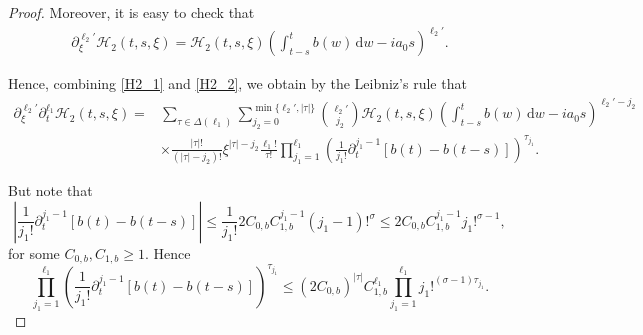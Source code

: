 \documentclass[10pt,a4paper]{amsart}
\begin{document}
\begin{proof}
    Moreover, it is easy to check that 
    \begin{align}\label{H2_2}
        \partial_\xi^{\ell_2'}\mathcal{H}_2(t,s,\xi) = \mathcal{H}_2(t,s,\xi)\left(\int_{t-s}^tb(w)\,\mathrm{d}w-ia_0s\right)^{\ell_2'}.
    \end{align}
    
    Hence, combining \eqref{H2_1} and \eqref{H2_2}, we obtain by the Leibniz's rule that
    \begin{align*}
    \partial_\xi^{\ell_2'}\partial_t^{\ell_1}\mathcal{H}_2(t,s,\xi) =&\sum_{\tau\in\Delta(\ell_1)}\sum_{j_2=0}^{\min\{\ell_2',|\tau|\}}\binom{\ell_2'}{j_2}\mathcal{H}_2(t,s,\xi)\left(\int_{t-s}^tb(w)\,\mathrm{d}w-ia_0s\right)^{\ell_2'-j_2}\\&\times\frac{|\tau|!}{(|\tau|-j_2)!}\xi^{|\tau|-j_2}
    \frac{\ell_1!}{\tau!}\prod_{j_1=1}^{\ell_1}\left(\frac{1}{j_1!}\partial_t^{j_1-1}[b(t)-b(t-s)]\right)^{\tau_{j_1}}. 
\end{align*}

But note that
\begin{equation*}
    \left|\frac{1}{j_1!}\partial_t^{j_1-1}[b(t)-b(t-s)]\right|\leq \frac{1}{j_1!}2C_{0,b}C_{1,b}^{j_1-1}(j_1-1)!^\sigma\leq 2C_{0,b}C_{1,b}^{j_1-1}j_1!^{\sigma-1}, 
\end{equation*}
for some $C_{0,b},C_{1,b}\geq 1$. Hence
\begin{equation*}
   \prod_{j_1=1}^{\ell_1}\left(\frac{1}{j_1!}\partial_t^{j_1-1}[b(t)-b(t-s)]\right)^{\tau_{j_1}}\leq (2C_{0,b})^{|\tau|}C_{1,b}^{\ell_1}\prod_{j_1=1}^{\ell_1}j_1!^{(\sigma-1)\tau_{j_1}}. 
\end{equation*}


\end{proof}
\end{document}

